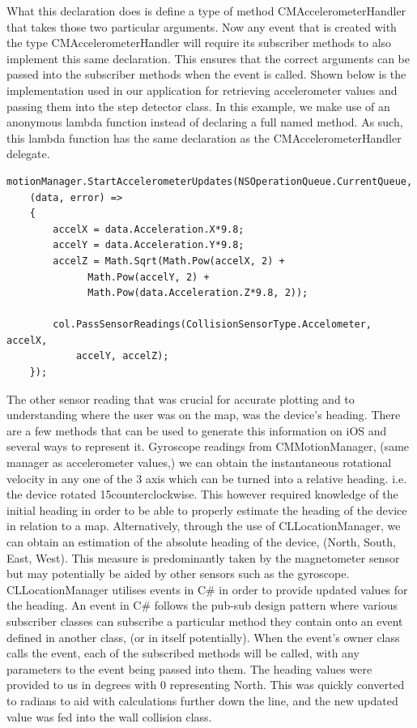 \documentclass[main.tex]{subfiles}
\begin{document}
What this declaration does is define a type of method CMAccelerometerHandler that takes those two particular arguments. Now any event that is created with the type CMAccelerometerHandler will require its subscriber methods to also implement this same declaration. This ensures that the correct arguments can be passed into the subscriber methods when the event is called. Shown below is the implementation used in our application for retrieving accelerometer values and passing them into the step detector class. In this example, we make use of an anonymous lambda function instead of declaring a full named method. As such, this lambda function has the same declaration as the CMAccelerometerHandler delegate.
\begin{lstlisting}
motionManager.StartAccelerometerUpdates(NSOperationQueue.CurrentQueue,
	(data, error) =>
	{
		accelX = data.Acceleration.X*9.8;
		accelY = data.Acceleration.Y*9.8;
		accelZ = Math.Sqrt(Math.Pow(accelX, 2) + 
			  Math.Pow(accelY, 2) + 
			  Math.Pow(data.Acceleration.Z*9.8, 2));

		col.PassSensorReadings(CollisionSensorType.Accelometer, accelX,
			accelY, accelZ);
	});
\end{lstlisting}

The other sensor reading that was crucial for accurate plotting and to understanding where the user was on the map, was the device’s heading. There are a few methods that can be used to generate this information on iOS and several ways to represent it. Gyroscope readings from CMMotionManager, (same manager as accelerometer values,) we can obtain the instantaneous rotational velocity in any one of the 3 axis which can be turned into a relative heading. i.e. the device rotated 15\deg counterclockwise. This however required knowledge of the initial heading in order to be able to properly estimate the heading of the device in relation to a map. Alternatively, through the use of CLLocationManager, we can obtain an estimation of the absolute heading of the device, (North, South, East, West). This measure is predominantly taken by the magnetometer sensor but may potentially be aided by other sensors such as the gyroscope. CLLocationManager utilises events in C# in order to provide updated values for the heading. An event in C# follows the pub-sub design pattern where various subscriber classes can subscribe a particular method they contain onto an event defined in another class, (or in itself potentially). When the event’s owner class calls the event, each of the subscribed methods will be called, with any parameters to the event being passed into them. The heading values were provided to us in degrees with 0 representing North. This was quickly converted to radians to aid with calculations further down the line, and the new updated value was fed into the wall collision class.
\end{document}
